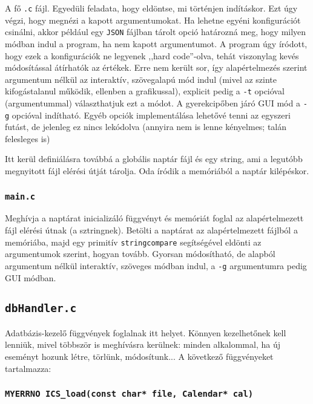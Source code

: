 \documentclass[a4paper]{article}
\begin{document}
A fő \texttt{.c} fájl. Egyedüli feladata, hogy eldöntse, mi történjen indításkor. Ezt úgy végzi, hogy megnézi a kapott argumentumokat. Ha lehetne egyéni konfigurációt csinálni, akkor például egy \texttt{JSON} fájlban tárolt opció határozná meg, hogy milyen módban indul a program, ha nem kapott argumentumot. A program úgy íródott, hogy ezek a konfigurációk ne legyenek ,,hard code''-olva, tehát viszonylag kevés módosítással átírhatók az értékek. Erre nem került sor, így alapértelmezés szerint argumentum nélkül az interaktív, szövegalapú mód indul (mivel az szinte kifogástalanul működik, ellenben a grafikussal), explicit pedig a \texttt{-t} opcióval (argumentummal) választhatjuk ezt a módot. A gyerekcipőben járó GUI mód a \texttt{-g} opcióval indítható. Egyéb opciók implementálása lehetővé tenni az egyszeri futást, de jelenleg ez nincs lekódolva (annyira nem is lenne kényelmes; talán felesleges is)

Itt kerül definiálásra továbbá a globális naptár fájl és egy string, ami a legutóbb megnyitott fájl elérési útját tárolja. Oda íródik a memóriából a naptár kilépéskor.

\subsubsection{\texttt{main.c}}

Meghívja a naptárat inicializáló függvényt és memóriát foglal az alapértelmezett fájl elérési útnak (a sztringnek). Betölti a naptárat az alapértelmezett fájlból a memóriába, majd egy primitív \texttt{stringcompare} segítségével eldönti az argumentumok szerint, hogyan tovább. Gyorsan módosítható, de alapból argumentum nélkül interaktív, szöveges módban indul, a \texttt{-g} argumentumra pedig GUI módban.

\subsection{\texttt{dbHandler.c}}

Adatbázis-kezelő függvények foglalnak itt helyet. Könnyen kezelhetőnek kell lenniük, mivel többször is meghívásra kerülnek: minden alkalommal, ha új eseményt hozunk létre, törlünk, módosítunk... A következő függvényeket tartalmazza:

\subsubsection{\texttt{MYERRNO ICS\_load(const char* file, Calendar* cal)}}
\end{document}
